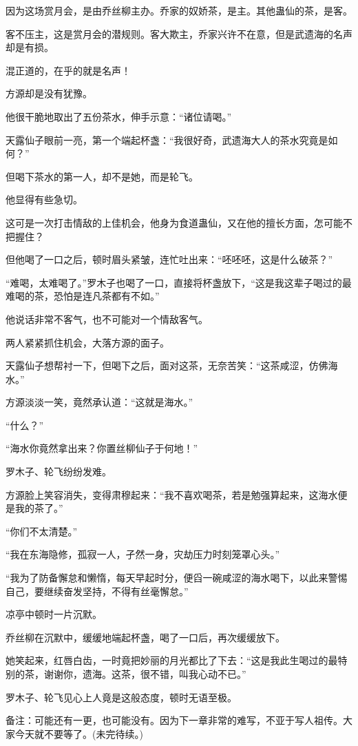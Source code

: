 \begin{this_body}
因为这场赏月会，是由乔丝柳主办。乔家的奴娇茶，是主。其他蛊仙的茶，是客。

客不压主，这是赏月会的潜规则。客大欺主，乔家兴许不在意，但是武遗海的名声却是有损。

混正道的，在乎的就是名声！

方源却是没有犹豫。

他很干脆地取出了五份茶水，伸手示意：“诸位请喝。”

天露仙子眼前一亮，第一个端起杯盏：“我很好奇，武遗海大人的茶水究竟是如何？”

但喝下茶水的第一人，却不是她，而是轮飞。

他显得有些急切。

这可是一次打击情敌的上佳机会，他身为食道蛊仙，又在他的擅长方面，怎可能不把握住？

但他喝了一口之后，顿时眉头紧皱，连忙吐出来：“呸呸呸，这是什么破茶？”

“难喝，太难喝了。”罗木子也喝了一口，直接将杯盏放下，“这是我这辈子喝过的最难喝的茶，恐怕是连凡茶都有不如。”

他说话非常不客气，也不可能对一个情敌客气。

两人紧紧抓住机会，大落方源的面子。

天露仙子想帮衬一下，但喝下之后，面对这茶，无奈苦笑：“这茶咸涩，仿佛海水。”

方源淡淡一笑，竟然承认道：“这就是海水。”

“什么？”

“海水你竟然拿出来？你置丝柳仙子于何地！”

罗木子、轮飞纷纷发难。

方源脸上笑容消失，变得肃穆起来：“我不喜欢喝茶，若是勉强算起来，这海水便是我的茶了。”

“你们不太清楚。”

“我在东海隐修，孤寂一人，孑然一身，灾劫压力时刻笼罩心头。”

“我为了防备懈怠和懒惰，每天早起时分，便舀一碗咸涩的海水喝下，以此来警惕自己，要继续奋发坚持，不得有丝毫懈怠。”

凉亭中顿时一片沉默。

乔丝柳在沉默中，缓缓地端起杯盏，喝了一口后，再次缓缓放下。

她笑起来，红唇白齿，一时竟把妙丽的月光都比了下去：“这是我此生喝过的最特别的茶，谢谢你，遗海。这茶，很不错，叫我心动不已。”

罗木子、轮飞见心上人竟是这般态度，顿时无语至极。

备注：可能还有一更，也可能没有。因为下一章非常的难写，不亚于写人祖传。大家今天就不要等了。(未完待续。)

\end{this_body}

